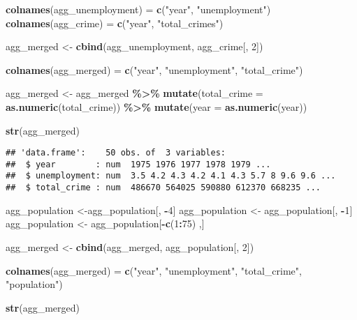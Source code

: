 \documentclass[
]{article}
\newenvironment{Shaded}{\begin{snugshade}}{\end{snugshade}}
\newcommand{\AttributeTok}[1]{\textcolor[rgb]{0.13,0.29,0.53}{#1}}
\newcommand{\DecValTok}[1]{\textcolor[rgb]{0.00,0.00,0.81}{#1}}
\newcommand{\FunctionTok}[1]{\textcolor[rgb]{0.13,0.29,0.53}{\textbf{#1}}}
\newcommand{\NormalTok}[1]{#1}
\newcommand{\OtherTok}[1]{\textcolor[rgb]{0.56,0.35,0.01}{#1}}
\newcommand{\SpecialCharTok}[1]{\textcolor[rgb]{0.81,0.36,0.00}{\textbf{#1}}}
\newcommand{\StringTok}[1]{\textcolor[rgb]{0.31,0.60,0.02}{#1}}
\begin{document}
\begin{Shaded}
\begin{Highlighting}[]
\FunctionTok{colnames}\NormalTok{(agg\_unemployment) }\OtherTok{=} \FunctionTok{c}\NormalTok{(}\StringTok{"year"}\NormalTok{, }\StringTok{"unemployment"}\NormalTok{)}
\FunctionTok{colnames}\NormalTok{(agg\_crime) }\OtherTok{=} \FunctionTok{c}\NormalTok{(}\StringTok{"year"}\NormalTok{, }\StringTok{"total\_crimes"}\NormalTok{)}

\NormalTok{agg\_merged }\OtherTok{\textless{}{-}} \FunctionTok{cbind}\NormalTok{(agg\_unemployment, agg\_crime[, }\DecValTok{2}\NormalTok{])}

\FunctionTok{colnames}\NormalTok{(agg\_merged) }\OtherTok{=} \FunctionTok{c}\NormalTok{(}\StringTok{"year"}\NormalTok{, }\StringTok{"unemployment"}\NormalTok{, }\StringTok{"total\_crime"}\NormalTok{)}

\NormalTok{agg\_merged }\OtherTok{\textless{}{-}}\NormalTok{ agg\_merged }\SpecialCharTok{\%\textgreater{}\%}
  \FunctionTok{mutate}\NormalTok{(}\AttributeTok{total\_crime =} \FunctionTok{as.numeric}\NormalTok{(total\_crime)) }\SpecialCharTok{\%\textgreater{}\%}
  \FunctionTok{mutate}\NormalTok{(}\AttributeTok{year =} \FunctionTok{as.numeric}\NormalTok{(year))}

\FunctionTok{str}\NormalTok{(agg\_merged)}
\end{Highlighting}
\end{Shaded}

\begin{verbatim}
## 'data.frame':    50 obs. of  3 variables:
##  $ year        : num  1975 1976 1977 1978 1979 ...
##  $ unemployment: num  3.5 4.2 4.3 4.2 4.1 4.3 5.7 8 9.6 9.6 ...
##  $ total_crime : num  486670 564025 590880 612370 668235 ...
\end{verbatim}

\begin{Shaded}
\begin{Highlighting}[]
\NormalTok{agg\_population }\OtherTok{\textless{}{-}}\NormalTok{agg\_population[, }\SpecialCharTok{{-}}\DecValTok{4}\NormalTok{]}
\NormalTok{agg\_population }\OtherTok{\textless{}{-}}\NormalTok{ agg\_population[, }\SpecialCharTok{{-}}\DecValTok{1}\NormalTok{]}
\NormalTok{agg\_population }\OtherTok{\textless{}{-}}\NormalTok{ agg\_population[}\SpecialCharTok{{-}}\FunctionTok{c}\NormalTok{(}\DecValTok{1}\SpecialCharTok{:}\DecValTok{75}\NormalTok{) ,]}

\NormalTok{agg\_merged }\OtherTok{\textless{}{-}} \FunctionTok{cbind}\NormalTok{(agg\_merged, agg\_population[, }\DecValTok{2}\NormalTok{])}

\FunctionTok{colnames}\NormalTok{(agg\_merged) }\OtherTok{=} \FunctionTok{c}\NormalTok{(}\StringTok{"year"}\NormalTok{, }\StringTok{"unemployment"}\NormalTok{, }\StringTok{"total\_crime"}\NormalTok{, }\StringTok{"population"}\NormalTok{)}

\FunctionTok{str}\NormalTok{(agg\_merged)}
\end{Highlighting}
\end{Shaded}
\end{document}
